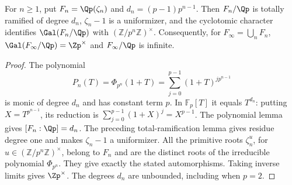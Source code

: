 \begin{lemma}
\label{ft:rational-cyclotomic}
\leanok
{}
For $n\geq1$, put $F_n=\Qp(\zeta_n)$ and
$d_n=(p-1)p^{n-1}$. Then $F_n/\Qp$ is totally ramified of degree $d_n$,
$\zeta_n-1$ is a uniformizer, and the cyclotomic character identifies
$\Gal(F_n/\Qp)$ with $(\mathbb Z/p^n\mathbb Z)^\times$.
Consequently, for $F_\infty=\bigcup_n F_n$,
$\Gal(F_\infty/\Qp)=\Zp^\times$ and $F_\infty/\Qp$ is infinite.
\end{lemma}
\begin{proof}
The polynomial
\[
 P_n(T)=\Phi_{p^n}(1+T)
       =\sum_{j=0}^{p-1}(1+T)^{jp^{n-1}}
\]
is monic of degree $d_n$ and has constant term $p$. In
$\mathbb F_p[T]$ it equals $T^{d_n}$: putting
$X=T^{p^{n-1}}$, its reduction is
$\sum_{j=0}^{p-1}(1+X)^j=X^{p-1}$.
The polynomial lemma gives $[F_n:\Qp]=d_n$.
The preceding total-ramification lemma gives residue degree one and
makes $\zeta_n-1$ a uniformizer.
All the primitive roots $\zeta_n^u$, for
$u\in(\mathbb Z/p^n\mathbb Z)^\times$, belong to $F_n$ and are the
distinct roots of the irreducible polynomial $\Phi_{p^n}$.
They give exactly the stated automorphisms. Taking inverse limits gives
$\Zp^\times$. The degrees $d_n$ are unbounded, including when $p=2$.
\end{proof}

